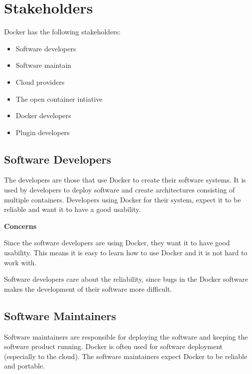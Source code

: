 
\section{Stakeholders}
\label{sec:stakeholders}

Docker has the following stakeholders:
\begin{itemize}
\item Software developers
\item Software maintain
\item Cloud providers
\item The open container intiative
\item Docker developers
\item Plugin developers
\end{itemize}

\subsection*{Software Developers}
The developers are those that use Docker to create their software systems. It is used by developers to deploy software and create architectures consisting of multiple containers. Developers using Docker for their system, expect it to be reliable and want it to have a good usability. 

\textbf{Concerns}
\begin{description}[labelindent=25pt,style=multiline,leftmargin=4.0cm,font=\normalfont\itshape]

\item[Usability] Since the software developers are using Docker, they want it to have good usability. This means it is easy to learn how to use Docker and it is not hard to work with. 

\item[Reliability] Software developers care about the reliability, since bugs in the Docker software makes the development of their software more difficult. 

\end{description}

\subsection*{Software Maintainers}
Software maintainers are responsible for deploying the software and keeping the software product running. Docker is often used for software deployment (especially to the cloud). %
The software maintainers expect Docker to be reliable and portable.

